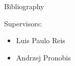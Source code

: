 \documentclass[compress]{beamer}
\begin{document}
\appendix

\begin{frame}[allowframebreaks]{Bibliography}


\end{frame}


\begin{frame}
    \titlepage
    Supervisors:
    \begin{itemize}
    \item Luis Paulo Reis
    \item Andrzej Pronobis
    \end{itemize}
\end{frame}
\end{document}
